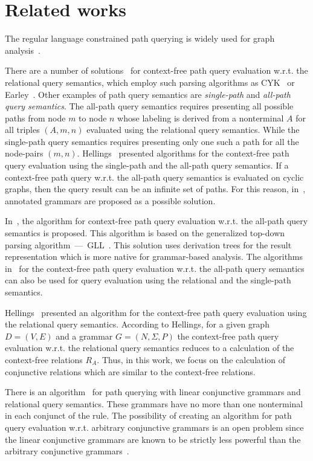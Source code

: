 \section{Related works} \label{section_related}
The regular language constrained path querying is widely used for graph analysis~\cite{abiteboul1997regular,fan2011adding,nole2016regular,reutter2017regular}.

There are a number of solutions~\cite{azimov2018context,hellingsRelational,GraphQueryWithEarley,RDF} for context-free path query evaluation w.r.t. the relational query semantics, which employ such parsing algorithms as CYK~\cite{kasami,younger} or Earley~\cite{Grune}. Other examples of path query semantics are \textit{single-path} and \textit{all-path query semantics}. The all-path query semantics requires presenting all possible paths from node $m$ to node $n$ whose labeling is derived from a nonterminal $A$ for all triples $(A, m, n)$ evaluated using the relational query semantics. While the single-path query semantics requires presenting only one such a path for all the node-pairs $(m, n)$. Hellings~\cite{hellingsPathQuerying} presented algorithms for the context-free path query evaluation using the single-path and the all-path query semantics. If a context-free path query w.r.t. the all-path query semantics is evaluated on cyclic graphs, then the query result can be an infinite set of paths. For this reason, in~\cite{hellingsPathQuerying}, annotated grammars are proposed as a possible solution.

In~\cite{GLL}, the algorithm for context-free path query evaluation w.r.t. the all-path query semantics is proposed. This algorithm is based on the generalized top-down parsing algorithm~---~GLL~\cite{scott2010gll}. This solution uses derivation trees for the result representation which is more native for grammar-based analysis. The algorithms in~\cite{GLL,hellingsPathQuerying} for the context-free path query evaluation w.r.t. the all-path query semantics can also be used for query evaluation using the relational and the single-path semantics.

Hellings~\cite{hellingsRelational} presented an algorithm for the context-free path query evaluation using the relational query semantics. According to Hellings, for a given graph $D = (V, E)$ and a grammar $G = (N, \Sigma, P)$ the context-free path query evaluation w.r.t. the relational query semantics reduces to a calculation of the context-free relations $R_A$. Thus, in this work, we focus on the calculation of conjunctive relations which are similar to the context-free relations.

There is an algorithm~\cite{zhang2017context} for path querying with linear conjunctive grammars and relational query semantics. These grammars have no more than one nonterminal in each conjunct of the rule. The possibility of creating an algorithm for path query evaluation w.r.t. arbitrary conjunctive grammars is an open problem since the linear conjunctive grammars are known to be strictly less powerful than the arbitrary conjunctive grammars~\cite{okhotinConjAndBool}.